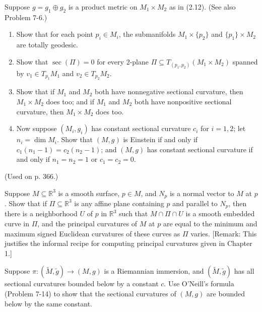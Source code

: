 \begin{exercise}
\label{prob:product-metric-submanifolds}
Suppose $g = g_1 \oplus g_2$ is a product metric on $M_1 \times M_2$ as in (2.12). (See also Problem 7-6.)

\begin{enumerate}
\item[(a)] Show that for each point $p_i \in M_i$, the submanifolds $M_1 \times \{p_2\}$ and $\{p_1\} \times M_2$ are totally geodesic.

\item[(b)] Show that $\sec(\Pi) = 0$ for every 2-plane $\Pi \subseteq T_{(p_1,p_2)}(M_1 \times M_2)$ spanned by $v_1 \in T_{p_1} M_1$ and $v_2 \in T_{p_2} M_2$.

\item[(c)] Show that if $M_1$ and $M_2$ both have nonnegative sectional curvature, then $M_1 \times M_2$ does too; and if $M_1$ and $M_2$ both have nonpositive sectional curvature, then $M_1 \times M_2$ does too.

\item[(d)] Now suppose $(M_i, g_i)$ has constant sectional curvature $c_i$ for $i = 1,2$; let $n_i = \dim M_i$. Show that $(M, g)$ is Einstein if and only if $c_1(n_1 - 1) = c_2(n_2 - 1)$; and $(M, g)$ has constant sectional curvature if and only if $n_1 = n_2 = 1$ or $c_1 = c_2 = 0$.
\end{enumerate}

(Used on p. 366.)
\end{exercise}

\begin{exercise}
\label{prob:surface-affine-plane-curvature}
Suppose $M \subseteq \mathbb{R}^3$ is a smooth surface, $p \in M$, and $N_p$ is a normal vector to $M$ at $p$. Show that if $\Pi \subseteq \mathbb{R}^3$ is any affine plane containing $p$ and parallel to $N_p$, then there is a neighborhood $U$ of $p$ in $\mathbb{R}^3$ such that $M \cap \Pi \cap U$ is a smooth embedded curve in $\Pi$, and the principal curvatures of $M$ at $p$ are equal to the minimum and maximum signed Euclidean curvatures of these curves as $\Pi$ varies. [Remark: This justifies the informal recipe for computing principal curvatures given in Chapter 1.]
\end{exercise}

\begin{exercise}
\label{prob:riemannian-immersion-bounded-sectional-curvatures}
Suppose $\pi: (\tilde{M}, \tilde{g}) \to (M, g)$ is a Riemannian immersion, and $(\tilde{M}, \tilde{g})$ has all sectional curvatures bounded below by a constant $c$. Use O'Neill's formula (Problem 7-14) to show that the sectional curvatures of $(M, g)$ are bounded below by the same constant.
\end{exercise}

